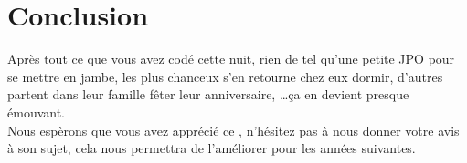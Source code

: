\chapter{Conclusion}

Après tout ce que vous avez codé cette nuit, rien de tel qu'une petite JPO pour se mettre en jambe, les plus chanceux s'en retourne chez eux dormir, d'autres partent dans leur famille fêter leur anniversaire, \ldots \c ca en devient presque émouvant.\\

Nous espèrons que vous avez apprécié ce \tp{}, n'hésitez pas à nous donner votre avis à son sujet, cela nous permettra de l'améliorer pour les années suivantes.